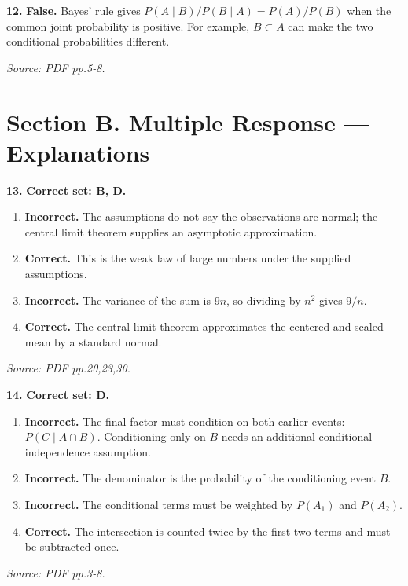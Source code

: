 \documentclass[11pt,a4paper]{article}
\begin{document}
\par\noindent\begin{minipage}{\linewidth}
\textbf{12.} \textbf{False.} Bayes' rule gives \(P(A\mid B)/P(B\mid A)=P(A)/P(B)\) when the common joint probability is positive. For example, \(B\subset A\) can make the two conditional probabilities different.

{\footnotesize\textit{Source: PDF pp.5-8.}}
\end{minipage}\par\vspace{3mm}
\newpage\section*{Section B. Multiple Response --- Explanations}
\par\noindent\begin{minipage}{\linewidth}
\textbf{13.} \textbf{Correct set: B, D.}
\begin{enumerate}[label=(\Alph*),leftmargin=8mm,itemsep=2pt,topsep=2pt]
\item \textbf{Incorrect.} The assumptions do not say the observations are normal; the central limit theorem supplies an asymptotic approximation.
\item \textbf{Correct.} This is the weak law of large numbers under the supplied assumptions.
\item \textbf{Incorrect.} The variance of the sum is \(9n\), so dividing by \(n^2\) gives \(9/n\).
\item \textbf{Correct.} The central limit theorem approximates the centered and scaled mean by a standard normal.
\end{enumerate}
{\footnotesize\textit{Source: PDF pp.20,23,30.}}

\end{minipage}\par\vspace{3mm}
\par\noindent\begin{minipage}{\linewidth}
\textbf{14.} \textbf{Correct set: D.}
\begin{enumerate}[label=(\Alph*),leftmargin=8mm,itemsep=2pt,topsep=2pt]
\item \textbf{Incorrect.} The final factor must condition on both earlier events: \(P(C\mid A\cap B)\). Conditioning only on \(B\) needs an additional conditional-independence assumption.
\item \textbf{Incorrect.} The denominator is the probability of the conditioning event \(B\).
\item \textbf{Incorrect.} The conditional terms must be weighted by \(P(A_1)\) and \(P(A_2)\).
\item \textbf{Correct.} The intersection is counted twice by the first two terms and must be subtracted once.
\end{enumerate}
{\footnotesize\textit{Source: PDF pp.3-8.}}

\end{minipage}\par\vspace{3mm}
\end{document}
